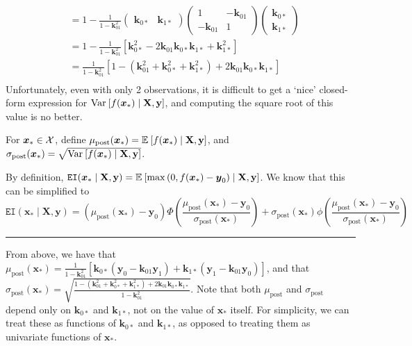 \documentclass[11pt]{article}
\def\EI{\texttt{EI}}
\newcommand{\bs}[1]{\boldsymbol{#1}}
\def\bsx{\bs{x}}
\def\bsy{\bs{y}}
\def\bsk{\bs{k}}
\def\xast{\bsx_{*}}
\begin{document}
\begin{align*}
&= 1 - \frac{1}{1 - \bsk_{01}^{2}}\begin{pmatrix}\bsk_{0*} & \bsk_{1*}\end{pmatrix}\begin{pmatrix}1 & -\bsk_{01}\\ -\bsk_{01} & 1\end{pmatrix}\begin{pmatrix}\bsk_{0*}\\ \bsk_{1*}\end{pmatrix}\\
&= 1 - \frac{1}{1 - \bsk_{01}^{2}}\left[\bsk_{0*}^{2} - 2\bsk_{01}\bsk_{0*}\bsk_{1*} + \bsk_{1*}^{2}\right]\\
&= \frac{1}{1 - \bsk_{01}^{2}}\left[1 - \left(\bsk_{01}^{2} + \bsk_{0*}^{2} + \bsk_{1*}^{2}\right) + 2\bsk_{01}\bsk_{0*}\bsk_{1*}\right]\\
\end{align*}
Unfortunately, even with only 2 observations, it is difficult to get a `nice' closed-form expression for $\var{f(\xast) \mid \mathbf{X}, \mathbf{y}}$, and computing the square root of this value is no better. 

For $\xast \in \calX$, define $\mu_{\textrm{post}}(\xast) = \expec{f(\xast) \mid \mathbf{X}, \mathbf{y}}$, and $\sigma_{\textrm{post}}(\xast) = \sqrt{\var{f(\xast) \mid \mathbf{X}, \mathbf{y}}}$.

By definition, $\EI(\xast \mid \mathbf{X}, \mathbf{y}) = \expec{\max\left(0, f(\xast) - \bsy_{0}\right) \mid \mathbf{X}, \mathbf{y}}$. We know that this can be simplified to 
\begin{equation*}
\EI(\xast \mid \mathbf{X}, \mathbf{y}) = \left(\mu_{\textrm{post}}(\xast) - \bsy_{0}\right)\Phi\left(\frac{\mu_{\textrm{post}}(\xast) - \bsy_{0}}{\sigma_{\textrm{post}}(\xast)}\right) + \sigma_{\textrm{post}}(\xast)\phi\left(\frac{\mu_{\textrm{post}}(\xast) - \bsy_{0}}{\sigma_{\textrm{post}}(\xast)}\right)
\end{equation*}
\noindent\rule{\textwidth}{0.8pt}

From above, we have that $\mu_{\textrm{post}}(\xast) = \frac{1}{1 - \bsk_{01}^2}\left[\bsk_{0*}\left(\bsy_{0} - \bsk_{01}\bsy_{1}\right) + \bsk_{1*}\left(\bsy_{1} - \bsk_{01}\bsy_{0}\right)\right]$, and that $\sigma_{\textrm{post}}(\xast) = \sqrt{\frac{1 - \left(\bsk_{01}^{2} + \bsk_{0*}^{2} + \bsk_{1*}^{2}\right) + 2\bsk_{01}\bsk_{0*}\bsk_{1*}}{1 - \bsk_{01}^{2}}}$. Note that both $\mu_{\textrm{post}}$ and $\sigma_{\textrm{post}}$ depend only on $\bsk_{0*}$ and $\bsk_{1*}$, not on the value of $\xast$ itself. For simplicity, we can treat these as functions of $\bsk_{0*}$ and $\bsk_{1*}$, as opposed to treating them as univariate functions of $\xast$. 
\end{document}
